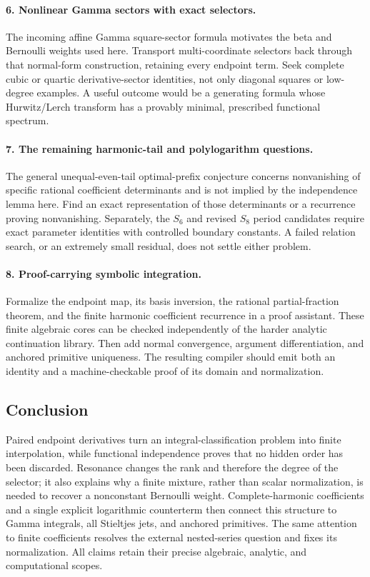 \documentclass[11pt,letterpaper]{article}
\numberwithin{equation}{section}
\theoremstyle{definition}
\theoremstyle{remark}\newtheorem{remark}[theorem]{Remark}
\begin{document}
\paragraph{6. Nonlinear Gamma sectors with exact selectors.}
The incoming affine Gamma square-sector formula motivates the beta
and Bernoulli weights used here. Transport multi-coordinate selectors
back through that normal-form construction, retaining every endpoint
term. Seek complete cubic or quartic derivative-sector identities,
not only diagonal squares or low-degree examples. A useful outcome
would be a generating formula whose Hurwitz/Lerch transform has a
provably minimal, prescribed functional spectrum.

\paragraph{7. The remaining harmonic-tail and polylogarithm questions.}
The general unequal-even-tail optimal-prefix conjecture concerns
nonvanishing of specific rational coefficient determinants and is not
implied by the independence lemma here. Find an exact representation
of those determinants or a recurrence proving nonvanishing. Separately,
the $S_6$ and revised $S_8$ period candidates require exact parameter
identities with controlled boundary constants. A failed relation
search, or an extremely small residual, does not settle either problem.

\paragraph{8. Proof-carrying symbolic integration.}
Formalize the endpoint map, its basis inversion, the rational
partial-fraction theorem, and the finite harmonic coefficient
recurrence in a proof assistant. These finite algebraic cores can be
checked independently of the harder analytic continuation library.
Then add normal convergence, argument differentiation, and anchored
primitive uniqueness. The resulting compiler should emit both an
identity and a machine-checkable proof of its domain and normalization.

\subsection*{Conclusion}

Paired endpoint derivatives turn an integral-classification problem
into finite interpolation, while functional independence proves that
no hidden order has been discarded. Resonance changes the rank and
therefore the degree of the selector; it also explains why a finite
mixture, rather than scalar normalization, is needed to recover a
nonconstant Bernoulli weight. Complete-harmonic coefficients and a
single explicit logarithmic counterterm then connect this structure to
Gamma integrals, all Stieltjes jets, and anchored primitives. The same
attention to finite coefficients resolves the external nested-series
question and fixes its normalization. All claims retain their precise
algebraic, analytic, and computational scopes.
\end{document}
